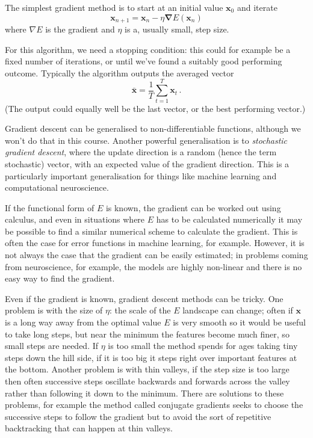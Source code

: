 \documentclass[12pt]{article}
\begin{document}
The simplest gradient method is to start at an initial
value $\mathbf{x}_0$ and iterate
\begin{equation}
\mathbf{x}_{n+1}=\mathbf{x}_n-\eta \mathbf{\nabla}E(\mathbf{x}_n)
\end{equation}
where ${\nabla}E$ is the gradient and $\eta$ is a, usually small, step
size. 

For this algorithm, we need a stopping condition: this could for example be a fixed number of iterations, or until we've found a suitably good performing outcome. Typically the algorithm outputs the averaged vector
\[
\bar{\mathbf{x}} = \frac1T \sum_{t=1}^T \mathbf{x}_t\,.
\]
(The output could equally well be the last vector, or the best performing vector.)

Gradient descent can be generalised to non-differentiable functions, although we won't do that in this course. Another powerful generalisation is to \emph{stochastic gradient descent}, where the update direction is a random (hence the term stochastic) vector, with an expected value of the gradient direction. This is a particularly important generalisation for things like machine learning and computational neuroscience. 

If the functional form of $E$ is known, the gradient can be
worked out using calculus, and even in situations where $E$ has to be
calculated numerically it may be possible to find a similar numerical
scheme to calculate the gradient. This is often the case for error
functions in machine learning, for example. However, it is not always
the case that the gradient can be easily estimated; in problems coming
from neuroscience, for example, the models are highly non-linear and
there is no easy way to find the gradient.

Even if the gradient is known, gradient descent methods can be
tricky. One problem is with the size of $\eta$: the scale of the $E$
landscape can change; often if $\mathbf{x}$ is a long way away from
the optimal value $E$ is very smooth so it would be useful to take
long steps, but near the minimum the features become much finer, so
small steps are needed. If $\eta$ is too small the method spends for
ages taking tiny steps down the hill side, if it is too big it steps
right over important features at the bottom. Another problem is with
thin valleys, if the step size is too large then often successive
steps oscillate backwards and forwards across the valley rather than
following it down to the minimum. There are solutions to these
problems, for example the method called conjugate gradients seeks to
choose the successive steps to follow the gradient but to avoid the
sort of repetitive backtracking that can happen at thin valleys.
\end{document}
